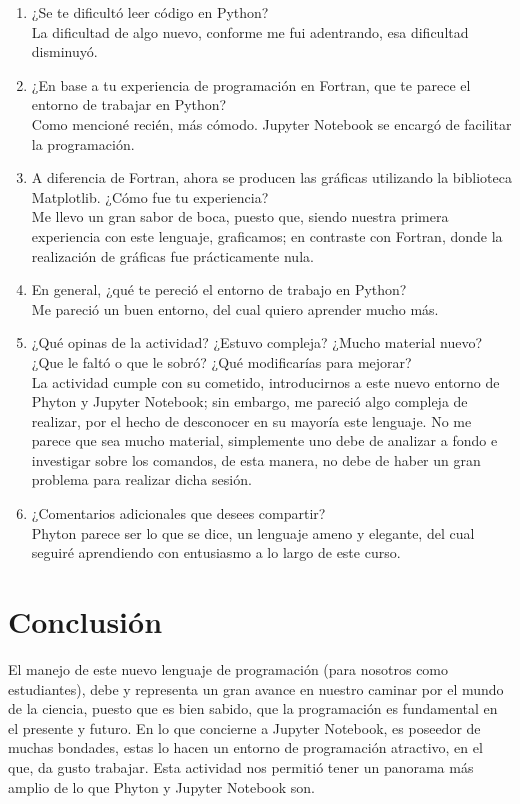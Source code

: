 \documentclass{article}
\begin{document}
\begin{doublespace}
\begin{itemize}
\begin{enumerate}
\item ¿Se te dificultó leer código en Python?
\\
La dificultad de algo nuevo, conforme me fui adentrando, esa dificultad disminuyó.
\item ¿En base a tu experiencia de programación en Fortran, que te parece el entorno de trabajar en Python?
\\
Como mencioné recién, más cómodo. Jupyter Notebook se encargó de facilitar la programación.
\item A diferencia de Fortran, ahora se producen las gráficas utilizando la biblioteca Matplotlib. ¿Cómo fue tu experiencia?
\\
Me llevo un gran sabor de boca, puesto que, siendo nuestra primera experiencia con este lenguaje, graficamos; en contraste con Fortran, donde la realización de gráficas fue prácticamente nula.
\item En general, ¿qué te pereció el entorno de trabajo en Python? 
\\
Me pareció un buen entorno, del cual quiero aprender mucho más.
\item ¿Qué opinas de la actividad? ¿Estuvo compleja? ¿Mucho material nuevo? ¿Que le faltó o que le sobró? ¿Qué modificarías para mejorar? 
\\
La actividad cumple con su cometido, introducirnos a este nuevo entorno de Phyton y Jupyter Notebook; sin embargo, me pareció algo compleja de realizar, por el hecho de desconocer en su mayoría este lenguaje. No me parece que sea mucho material, simplemente uno debe de analizar a fondo e investigar sobre los comandos, de esta manera, no debe de haber un gran problema para realizar dicha sesión.

\item ¿Comentarios adicionales que desees compartir? 
\\
Phyton parece ser lo que se dice, un lenguaje ameno y elegante, del cual seguiré aprendiendo con entusiasmo a lo largo de este curso.

\end{enumerate}

\section{Conclusión}

El manejo de este nuevo lenguaje de programación (para nosotros como estudiantes), debe y representa un gran avance en nuestro caminar por el mundo de la ciencia, puesto que es bien sabido, que la programación es fundamental en el presente y futuro. En lo que concierne a Jupyter Notebook, es poseedor de muchas bondades, estas lo hacen un entorno de programación atractivo, en el que, da gusto trabajar. Esta actividad nos permitió tener un panorama más amplio de lo que Phyton y Jupyter Notebook son.


\end{itemize}
\end{doublespace}
\end{document}
